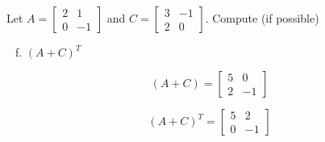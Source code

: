 \documentclass[../main.tex]{subfiles}
\begin{document}
Let
$A = \left[\begin{array}{rr}
	2 & 1 \\
	0 & -1
\end{array}\right]$
and
$C = \left[\begin{array}{rr}
	3 & -1 \\
	2 & 0
\end{array}\right]$.
Compute (if possible)
\begin{enumerate}[a)]
	\setcounter{enumi}{5}
	\item $(A + C)^T$
\end{enumerate}

\solution

\[(A+C) = \left[\begin{array}{rr}
	5 & 0 \\
	2 & -1
\end{array}\right]\]


\[(A+C)^T = \left[\begin{array}{rr}
	5 & 2 \\
	0 & -1
\end{array}\right]\]
\end{document}

